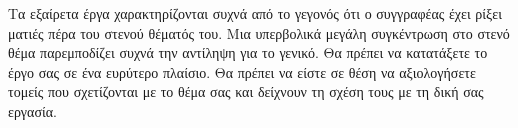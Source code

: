 Τα εξαίρετα  έργα χαρακτηρίζονται συχνά από το γεγονός ότι ο συγγραφέας έχει ρίξει ματιές πέρα του στενού θέματός του. Μια υπερβολικά μεγάλη συγκέντρωση στο στενό θέμα παρεμποδίζει συχνά την αντίληψη για το γενικό. Θα πρέπει να κατατάξετε το έργο σας σε ένα ευρύτερο πλαίσιο. Θα πρέπει να είστε σε θέση να αξιολογήσετε τομείς που σχετίζονται με το θέμα σας και δείχνουν τη σχέση τους με τη δική σας εργασία.
